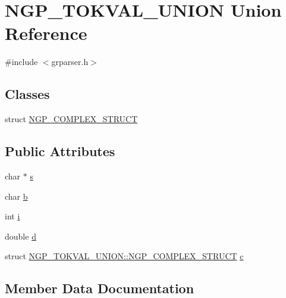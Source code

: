 \hypertarget{union_n_g_p___t_o_k_v_a_l___u_n_i_o_n}{}\section{N\+G\+P\+\_\+\+T\+O\+K\+V\+A\+L\+\_\+\+U\+N\+I\+ON Union Reference}
\label{union_n_g_p___t_o_k_v_a_l___u_n_i_o_n}


{\ttfamily \#include $<$grparser.\+h$>$}

\subsection*{Classes}
\begin{DoxyCompactItemize}
\item 
struct \hyperlink{struct_n_g_p___t_o_k_v_a_l___u_n_i_o_n_1_1_n_g_p___c_o_m_p_l_e_x___s_t_r_u_c_t}{N\+G\+P\+\_\+\+C\+O\+M\+P\+L\+E\+X\+\_\+\+S\+T\+R\+U\+CT}
\end{DoxyCompactItemize}
\subsection*{Public Attributes}
\begin{DoxyCompactItemize}
\item 
char $\ast$ \hyperlink{union_n_g_p___t_o_k_v_a_l___u_n_i_o_n_a2fabf3d5e3f07bbe0843d1f55c2714fa}{s}
\item 
char \hyperlink{union_n_g_p___t_o_k_v_a_l___u_n_i_o_n_a4cd8d1dbdda86d9a597bf7584310aa32}{b}
\item 
int \hyperlink{union_n_g_p___t_o_k_v_a_l___u_n_i_o_n_a78814cf9332ec3577644a2575f986cb2}{i}
\item 
double \hyperlink{union_n_g_p___t_o_k_v_a_l___u_n_i_o_n_a5bccb3f8560fb8644d56cb7e4c9e20de}{d}
\item 
struct \hyperlink{struct_n_g_p___t_o_k_v_a_l___u_n_i_o_n_1_1_n_g_p___c_o_m_p_l_e_x___s_t_r_u_c_t}{N\+G\+P\+\_\+\+T\+O\+K\+V\+A\+L\+\_\+\+U\+N\+I\+O\+N\+::\+N\+G\+P\+\_\+\+C\+O\+M\+P\+L\+E\+X\+\_\+\+S\+T\+R\+U\+CT} \hyperlink{union_n_g_p___t_o_k_v_a_l___u_n_i_o_n_a41c638257d8e788149fa9a9d625c820e}{c}
\end{DoxyCompactItemize}


\subsection{Member Data Documentation}
\mbox{\label{union_n_g_p___t_o_k_v_a_l___u_n_i_o_n_a4cd8d1dbdda86d9a597bf7584310aa32}} 
